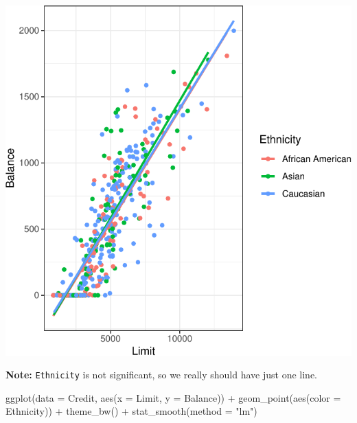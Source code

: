 \documentclass[
]{article}
\newenvironment{Shaded}{\begin{snugshade}}{\end{snugshade}}
\newcommand{\AttributeTok}[1]{\textcolor[rgb]{0.77,0.63,0.00}{#1}}
\newcommand{\FunctionTok}[1]{\textcolor[rgb]{0.00,0.00,0.00}{#1}}
\newcommand{\NormalTok}[1]{#1}
\newcommand{\SpecialCharTok}[1]{\textcolor[rgb]{0.00,0.00,0.00}{#1}}
\newcommand{\StringTok}[1]{\textcolor[rgb]{0.31,0.60,0.02}{#1}}
\begin{document}
\begin{center}\includegraphics{SDM-CHAP24_files/figure-latex/threesep-1} \end{center}

\textbf{Note:} \texttt{Ethnicity} is not significant, so we really should have just one line.

\begin{Shaded}
\begin{Highlighting}[]
\FunctionTok{ggplot}\NormalTok{(}\AttributeTok{data =}\NormalTok{ Credit, }\FunctionTok{aes}\NormalTok{(}\AttributeTok{x =}\NormalTok{ Limit, }\AttributeTok{y =}\NormalTok{ Balance)) }\SpecialCharTok{+}
  \FunctionTok{geom\_point}\NormalTok{(}\FunctionTok{aes}\NormalTok{(}\AttributeTok{color =}\NormalTok{ Ethnicity)) }\SpecialCharTok{+} 
  \FunctionTok{theme\_bw}\NormalTok{() }\SpecialCharTok{+}
  \FunctionTok{stat\_smooth}\NormalTok{(}\AttributeTok{method =} \StringTok{"lm"}\NormalTok{)}
\end{Highlighting}
\end{Shaded}
\end{document}

